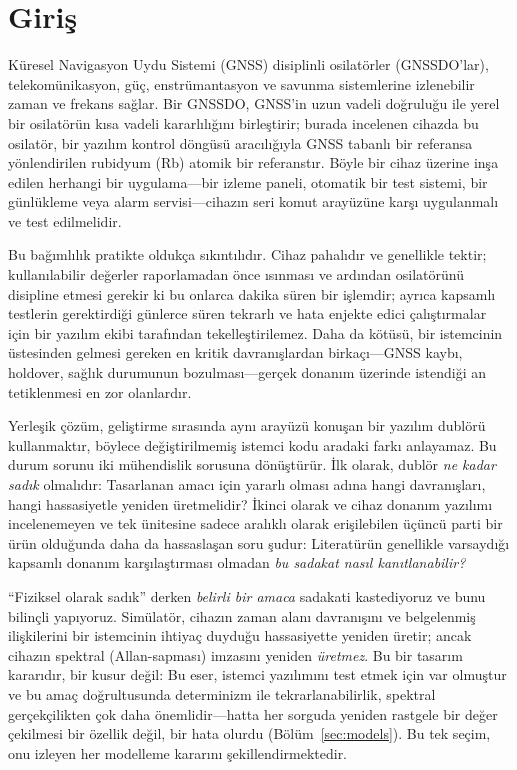 \documentclass[conference]{IEEEtran}
\begin{document}
\section{Giriş}
Küresel Navigasyon Uydu Sistemi (GNSS) disiplinli osilatörler (GNSSDO'lar), telekomünikasyon, güç, enstrümantasyon ve savunma sistemlerine izlenebilir zaman ve frekans sağlar. Bir GNSSDO, GNSS'in uzun vadeli doğruluğu ile yerel bir osilatörün kısa vadeli kararlılığını birleştirir; burada incelenen cihazda bu osilatör, bir yazılım kontrol döngüsü aracılığıyla GNSS tabanlı bir referansa yönlendirilen rubidyum (Rb) atomik bir referanstır. Böyle bir cihaz üzerine inşa edilen herhangi bir uygulama---bir izleme paneli, otomatik bir test sistemi, bir günlükleme veya alarm servisi---cihazın seri komut arayüzüne karşı uygulanmalı ve test edilmelidir.

Bu bağımlılık pratikte oldukça sıkıntılıdır. Cihaz pahalıdır ve genellikle tektir; kullanılabilir değerler raporlamadan önce ısınması ve ardından osilatörünü disipline etmesi gerekir ki bu onlarca dakika süren bir işlemdir; ayrıca kapsamlı testlerin gerektirdiği günlerce süren tekrarlı ve hata enjekte edici çalıştırmalar için bir yazılım ekibi tarafından tekelleştirilemez. Daha da kötüsü, bir istemcinin üstesinden gelmesi gereken en kritik davranışlardan birkaçı---GNSS kaybı, holdover, sağlık durumunun bozulması---gerçek donanım üzerinde istendiği an tetiklenmesi en zor olanlardır.

Yerleşik çözüm, geliştirme sırasında aynı arayüzü konuşan bir yazılım dublörü kullanmaktır, böylece değiştirilmemiş istemci kodu aradaki farkı anlayamaz. Bu durum sorunu iki mühendislik sorusuna dönüştürür. İlk olarak, dublör \emph{ne kadar sadık} olmalıdır: Tasarlanan amacı için yararlı olması adına hangi davranışları, hangi hassasiyetle yeniden üretmelidir? İkinci olarak ve cihaz donanım yazılımı incelenemeyen ve tek ünitesine sadece aralıklı olarak erişilebilen üçüncü parti bir ürün olduğunda daha da hassaslaşan soru şudur: Literatürün genellikle varsaydığı kapsamlı donanım karşılaştırması olmadan \emph{bu sadakat nasıl kanıtlanabilir?}

``Fiziksel olarak sadık'' derken \emph{belirli bir amaca} sadakati kastediyoruz ve bunu bilinçli yapıyoruz. Simülatör, cihazın zaman alanı davranışını ve belgelenmiş ilişkilerini bir istemcinin ihtiyaç duyduğu hassasiyette yeniden üretir; ancak cihazın spektral (Allan-sapması) imzasını yeniden \emph{üretmez}. Bu bir tasarım kararıdır, bir kusur değil: Bu eser, istemci yazılımını test etmek için var olmuştur ve bu amaç doğrultusunda determinizm ile tekrarlanabilirlik, spektral gerçekçilikten çok daha önemlidir---hatta her sorguda yeniden rastgele bir değer çekilmesi bir özellik değil, bir hata olurdu (Bölüm~\ref{sec:models}). Bu tek seçim, onu izleyen her modelleme kararını şekillendirmektedir.
\end{document}

